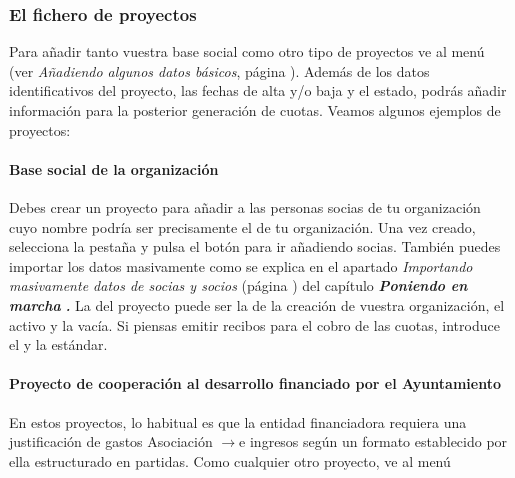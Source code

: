 \subsubsection{El fichero de proyectos}
Para añadir tanto vuestra base social como otro tipo de proyectos ve
al menú  (ver \textit{Añadiendo algunos datos básicos},
página \pageref{ref:aadiendoalgunosdatosbasico}). Además de los
datos identificativos del proyecto, las fechas de alta y/o baja y el
estado, podrás añadir información para la posterior generación
de cuotas. Veamos algunos ejemplos de proyectos:

\paragraph{Base social de la organización}
Debes crear un proyecto para añadir a las personas socias de tu
organización cuyo nombre podría ser precisamente el de tu
organización. Una vez creado, selecciona la pestaña
 y pulsa el botón
para ir añadiendo socias. También
puedes importar los datos masivamente como se explica en el apartado
\textit{Importando masivamente datos de socias y socios} (página
\pageref{ref:Importandomasivamente}) del capítulo
\textbf{\textit{Poniendo en marcha \appname}}\textbf{\textit{.}} La
 del proyecto puede ser la de la
creación de vuestra organización, el 
activo y la  vacía. Si piensas
emitir recibos para el cobro de las cuotas, introduce el
 y la  estándar. 

\paragraph{Proyecto de cooperación al desarrollo financiado por el
Ayuntamiento}
En estos proyectos, lo habitual es que la entidad financiadora requiera
una justificación de gastos Asociación $\rightarrow $e ingresos
según un formato establecido por ella estructurado en partidas. Como
cualquier otro proyecto, ve al menú \textstyleGUIELEMENT{\textmd{\textup{\ref{ref:Partidasproyectos}}}}

